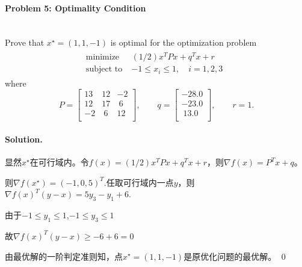 \documentclass[a4paper]{article}
\newenvironment{solution}
{\color{blue} \paragraph{Solution.}}
{\newline \qed}
\begin{document}
\paragraph{Problem 5: Optimality Condition}
~\\
Prove that $x^\star=(1,1,-1)$ is optimal for the optimization problem
\begin{gather*}
\begin{matrix}
\text{minimize~~} & (1/2)x^TPx+q^Tx+r\quad~~\\
\text{subject to} & -1\leq x_i\leq1,\quad i=1,2,3
\end{matrix}
\end{gather*}
where
\begin{equation*}
P=\begin{bmatrix}
13&12&-2\\
12&17&~6\\
-2&~6&12\\
\end{bmatrix},\quad\quad q=\begin{bmatrix}
-28.0\\
-23.0\\
~13.0\\
\end{bmatrix},\quad\quad r=1.
\end{equation*}
\begin{solution}
    显然$x^\star$在可行域内。令$f(x) = (1/2)x^TPx+q^Tx+r$，则$\nabla f(x)=P^Tx+q$。

    则$\nabla f(x^\star)=(-1, 0, 5)^T$.任取可行域内一点$y$，则$\nabla f(x)^T(y-x)=5y_3-y_1+6$.

    由于$-1\leq y_1\leq 1$,$-1\leq y_3 \leq 1$

    故$\nabla f(x)^T(y-x)\geq -6+6=0$

    由最优解的一阶判定准则知，点$x^\star=(1, 1, -1)$是原优化问题的最优解。
\end{solution}
\end{document}
